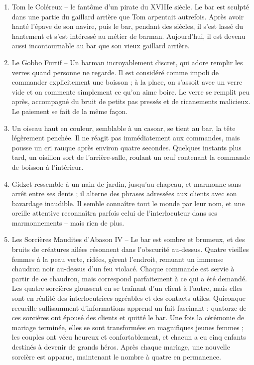 \documentclass{article}
\begin{document}
\begin{enumerate}
	\item Tom le Coléreux – le fantôme d’un pirate du XVIIIe siècle. Le bar est sculpté dans une partie du gaillard arrière que Tom arpentait autrefois. Après avoir hanté l’épave de son navire, puis le bar, pendant des siècles, il s’est lassé du hantement et s’est intéressé au métier de barman. Aujourd’hui, il est devenu aussi incontournable au bar que son vieux gaillard arrière.
	\item Le Gobbo Furtif – Un barman incroyablement discret, qui adore remplir les verres quand personne ne regarde. Il est considéré comme impoli de commander explicitement une boisson ; à la place, on s’assoit avec un verre vide et on commente simplement ce qu’on aime boire. Le verre se remplit peu après, accompagné du bruit de petits pas pressés et de ricanements malicieux. Le paiement se fait de la même façon.
	\item Un oiseau haut en couleur, semblable à un casoar, se tient au bar, la tête légèrement penchée. Il ne réagit pas immédiatement aux commandes, mais pousse un cri rauque après environ quatre secondes. Quelques instants plus tard, un oisillon sort de l’arrière-salle, roulant un œuf contenant la commande de boisson à l’intérieur.
	\item Gidzet ressemble à un nain de jardin, jusqu’au chapeau, et marmonne sans arrêt entre ses dents ; il alterne des phrases adressées aux clients avec son bavardage inaudible. Il semble connaître tout le monde par leur nom, et une oreille attentive reconnaîtra parfois celui de l’interlocuteur dans ses marmonnements – mais rien de plus.
	\item Les Sorcières Maudites d’Abason IV – Le bar est sombre et brumeux, et des bruits de créatures ailées résonnent dans l’obscurité au-dessus. Quatre vieilles femmes à la peau verte, ridées, gèrent l’endroit, remuant un immense chaudron noir au-dessus d’un feu violacé. Chaque commande est servie à partir de ce chaudron, mais correspond parfaitement à ce qui a été demandé. Les quatre sorcières gloussent en se traînant d’un client à l’autre, mais elles sont en réalité des interlocutrices agréables et des contacts utiles. Quiconque recueille suffisamment d’informations apprend un fait fascinant : quatorze de ces sorcières ont épousé des clients et quitté le bar. Une fois la cérémonie de mariage terminée, elles se sont transformées en magnifiques jeunes femmes ; les couples ont vécu heureux et confortablement, et chacun a eu cinq enfants destinés à devenir de grands héros. Après chaque mariage, une nouvelle sorcière est apparue, maintenant le nombre à quatre en permanence.

\end{enumerate}
\end{document}
